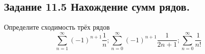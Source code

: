\subsection*{\textbf{Задание 11.5} Нахождение сумм рядов.}
Определите сходимость трёх рядов
\[
    \sum\limits_{n=1}^\infty(-1)^{n+1}\frac{1}{n};
    \sum\limits_{n=0}^\infty(-1)^{n+1}\frac{1}{2n+1};
    \sum\limits_{n=0}^\infty\frac{1}{n!}
\]

\begin{figure}[H]
    \renewcommand{\figurename}{Рисунок}
    \label{fig:image_5}
\end{figure}